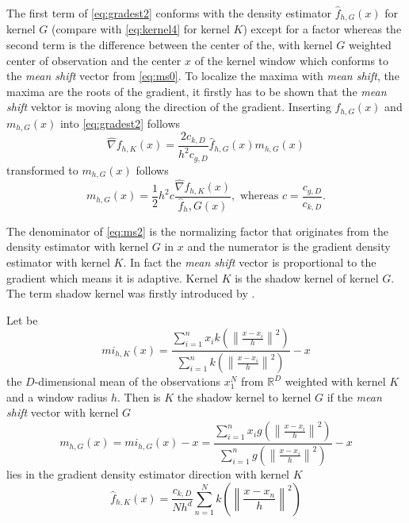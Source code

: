 The first term of \autoref{eq:gradest2} conforms with the density estimator
$\hat{f}_{h,G}(x)$ for kernel $G$ (compare with \autoref{eq:kernel4} for kernel
$K$) except for a factor whereas the second term is the difference between the
center of the, with kernel $G$ weighted center of observation and the center $x$
of the kernel window which conforms to the \emph{mean shift} vector from 
\autoref{eq:ms0}.
To localize the maxima with \emph{mean shift}, the maxima are the roots of the gradient,
it firstly has to be shown that the \emph{mean shift} vektor is moving along the 
direction of the gradient. Inserting $\hat{f}_{h,G}(x)$ and $m_{h,G}(x)$ into
\autoref{eq:gradest2} follows
\begin{equation}\label{eq:ms1}
	\hat{\nabla} f_{h,K}(x) = \frac{2c_{k,D}}{h^2c_{g,D}} 
	\hat{f}_{h,G}(x)m_{h,G}(x)
\end{equation}
transformed to $m_{h,G}(x)$ follows
\begin{equation}\label{eq:ms2}
	m_{h,G}(x) = \frac{1}{2}h^2 c 
	\frac{\hat{\nabla} f_{h,K}(x)}{\hat{f}_h,G(x)}, \textrm{ whereas } 
	c = \frac{c_{g,D}}{c_{k,D}}.
\end{equation}

The denominator of \autoref{eq:ms2} is the normalizing factor that originates 
from the density estimator with kernel $G$ in $x$ and the numerator is the 
gradient density estimator with kernel $K$. In fact the \emph{mean shift} vector
is proportional to the gradient which means it is adaptive. Kernel $K$ is the 
shadow kernel of kernel $G$. The term shadow kernel was firstly introduced by
\citeauthor{citeulike:2522867} \citep{citeulike:2522867}.

Let be
\begin{equation}\label{eq:msi}
	mi_{h,K}(x) = \frac{\sum_{i=1}^n x_i k\left(\left\lVert \frac{x - x_i}{h}
	\right\rVert^2\right)}{\sum_{i=1}^n k\left(\left\lVert \frac{x - x_i}{h}
	\right\rVert^2\right)} -x
\end{equation}
the $D$-dimensional mean of the observations $x_1^N$ from $\mathbb{R}^D$ 
weighted with kernel $K$ and a window radius $h$. Then is $K$ the 
shadow kernel to kernel $G$ if the \emph{mean shift} vector with kernel $G$
\begin{equation}\label{eq:msi2}	
	m_{h,G}(x) = mi_{h,G}(x) - x = 
	\frac{\sum_{i=1}^n x_i g\left(\left\lVert \frac{x - x_i}{h}
	\right\rVert^2\right)}{\sum_{i=1}^n g\left(\left\lVert \frac{x - x_i}{h}
	\right\rVert^2\right)} -x
\end{equation}
lies in the gradient density estimator direction with kernel $K$
\begin{equation}\label{eq:msi3}
	\hat{f}_{h,K}(x) = \frac{c_{k,D}}{Nh^d}
	\sum_{n = 1}^N k\left(\left\lVert \frac{x-x_n}{h} \right\rVert^2\right)
\end{equation}

